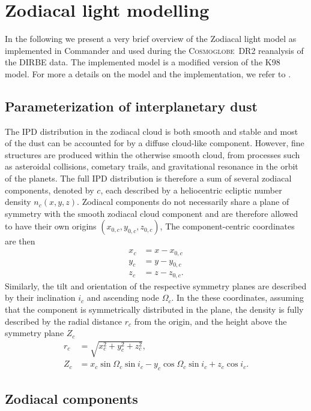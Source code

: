 \documentclass{aa}
\def\Cosmoglobe{\textsc{Cosmoglobe}}
\begin{document}
\section{Zodiacal light modelling}
In the following we present a very brief overview of the Zodiacal light model as implemented in Commander and used during the \Cosmoglobe\ DR2 reanalysis of the DIRBE data. The implemented model is a modified version of the K98 model. For more a details on the model and the implementation, we refer to \cite{K98, ZODIPY}.
\subsection{Parameterization of interplanetary dust}
The IPD distribution in the zodiacal cloud is both smooth and stable and most of the dust can be accounted for by a diffuse cloud-like component. However, fine structures are produced within the otherwise smooth cloud, from processes such as asteroidal collisions, cometary trails, and gravitational resonance in the orbit of the planets. The full IPD distribution is therefore a sum of several zodiacal components, denoted by $c$, each described by a heliocentric ecliptic number density $n_c(x,y,z)$. Zodiacal components do not necessarily share a plane of symmetry with the smooth zodiacal cloud component and are therefore allowed to have their own origins $(x_{0,c}, y_{0,c}, z_{0,c})$,  The component-centric coordinates are then
\begin{equation}    
    \begin{aligned}
        x_c&= x - x_{0,c}\\
        y_c&= y - y_{0,c}\\
        z_c&= z - z_{0,c}.
    \end{aligned}
\end{equation}
Similarly, the tilt and orientation of the respective symmetry planes are described by their inclination $i_c$ and ascending node $\Omega_c$. In the these coordinates, assuming that the component is symmetrically distributed in the plane, the density is fully described by the radial distance $r_c$ from the origin, and the height above the symmetry plane $Z_c$
\begin{align}
    r_c &= \sqrt{x_c^2 + y_c^2 + z_c^2},\\
    Z_c &= x_c\sin{\Omega_c}\sin{i_c} - y_c \cos{\Omega_c}\sin{i_c} + z_c \cos{i_c}.
\end{align}


\subsection{Zodiacal components}
\end{document}
